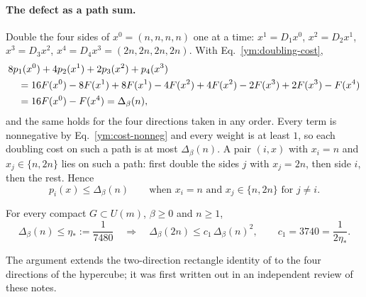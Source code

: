 \paragraph{The defect as a path sum.} Double the four sides of
$x^0=(n,n,n,n)$ one at a time: $x^1=D_1x^0$, $x^2=D_2x^1$, $x^3=D_3x^2$,
$x^4=D_4x^3=(2n,2n,2n,2n)$. With Eq.~\eqref{ym:doubling-cost},
\begin{align}
 &8p_1(x^0)+4p_2(x^1)+2p_3(x^2)+p_4(x^3)\notag\\
 &\quad=16F(x^0)-8F(x^1)+8F(x^1)-4F(x^2)+4F(x^2)-2F(x^3)+2F(x^3)-F(x^4)
 \notag\\
 &\quad=16F(x^0)-F(x^4)=\Delta_\beta(n),\label{ym:defect-path}
\end{align}
and the same holds for the four directions taken in any order. Every term is
nonnegative by Eq.~\eqref{ym:cost-nonneg} and every weight is at least $1$,
so each doubling cost on such a path is at most $\Delta_\beta(n)$. A pair
$(i,x)$ with $x_i=n$ and $x_j\in\{n,2n\}$ lies on such a path: first double
the sides $j$ with $x_j=2n$, then side $i$, then the rest. Hence
\begin{equation}\label{ym:cost-cube}
 p_i(x)\le\Delta_\beta(n)\qquad\text{when }x_i=n\text{ and }x_j\in\{n,2n\}
 \text{ for }j\ne i.
\end{equation}
\begin{theorem}\label{ym:thm:recurrence}
For every compact $G\subset U(m)$, $\beta\ge0$ and $n\ge1$,
\begin{equation}\label{ym:recurrence}
 \Delta_\beta(n)\le\eta_*:=\frac{1}{7480}\quad\Longrightarrow\quad
 \Delta_\beta(2n)\le c_1\,\Delta_\beta(n)^2,\qquad c_1=3740=\frac{1}{2\eta_*}.
\end{equation}
\end{theorem}
The argument extends the two-direction rectangle identity of
\cite{OpenAIO4Sharp2026} to the four directions of the hypercube; it was
first written out in an independent review of these notes.
